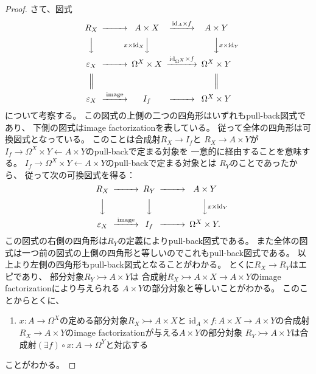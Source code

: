 \documentclass[uplatex]{jsarticle}
\theoremstyle{definition}
\def\ep{\varepsilon}
\def\id{\mathrm{id}}
\newcommand{\rtot}{\rightarrowtail}
\begin{document}
\begin{proof}
  さて、図式
  \[
  \begin{CD}
    R_X @>>> A\times X @> \id_A \times f >> A\times Y \\
    @VVV @V x\times \id_X VV @VV x\times \id_Y V \\
    \ep_X @>>> \Omega^X \times X
    @> \id_{\Omega^X} \times f >> \Omega^X\times Y \\
    @| @. @| \\
    \ep_X @> \text{image} >> I_f @>>> \Omega^X\times Y
  \end{CD}
  \]
  について考察する。
  この図式の上側の二つの四角形はいずれもpull-back図式であり、
  下側の図式はimage factorizationを表している。
  従って全体の四角形は可換図式となっている。
  このことは合成射\(R_X \to I_f\)と
  \(R_X\to A\times Y\)が
  \(I_f\to \Omega^X \times Y \gets A\times Y\)のpull-backで定まる対象を
  一意的に経由することを意味する。
  \(I_f\to \Omega^X \times Y \gets A\times Y\)のpull-backで定まる対象とは
  \(R_Y\)のことであったから、
  従って次の可換図式を得る：
  \[
  \begin{CD}
    R_X @>>> R_Y @>>> A\times Y \\
    @VVV @VVV @VV x\times \id_Y V \\
    \ep_X @> \text{image} >> I_f @>>> \Omega^X\times Y.
  \end{CD}
  \]
  この図式の右側の四角形は\(R_Y\)の定義によりpull-back図式である。
  また全体の図式は一つ前の図式の上側の四角形と等しいのでこれもpull-back図式である。
  以上より左側の四角形もpull-back図式となることがわかる。
  とくに\(R_X\to R_Y\)はエピであり、
  部分対象\(R_Y\rtot A\times Y\)は
  合成射\(R_X\rtot A\times X \to A\times Y\)のimage factorizationにより与えられる
  \(A\times Y\)の部分対象と等しいことがわかる。
  このことからとくに、
  \begin{enumerate}
    \item \label{enumi: prob: 1.10.4.1 in proof}
    \(x:A\to \Omega^X\)の定める部分対象\(R_X \rtot A\times X\)と
    \(\id_A \times f : A\times X \to A\times Y\)の合成射
    \(R_X\to A\times Y\)のimage factorizationが与える\(A\times Y\)の部分対象
    \(R_Y \rtot A\times Y\)は合成射\((\exists f)\circ x : A\to \Omega^Y\)と対応する
  \end{enumerate}
  ことがわかる。


\end{proof}
\end{document}
